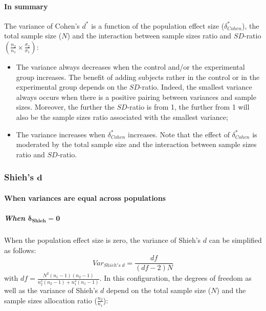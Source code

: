 \documentclass[
  english,
  man,mask,floatsintext]{apa6}
\providecommand{\tightlist}{%
  \setlength{\itemsep}{0pt}\setlength{\parskip}{0pt}}
\let\oldparagraph\paragraph
\renewcommand{\paragraph}[1]{\oldparagraph{#1}\mbox{}}
\let\oldsubparagraph\subparagraph
\renewcommand{\subparagraph}[1]{\oldsubparagraph{#1}\mbox{}}
\begin{document}
\hypertarget{in-summary-3}{%
\paragraph{In summary}\label{in-summary-3}}

The variance of Cohen's \(d^*\) is a function of the population effect size (\(\delta^*_{Cohen}\)), the total sample size (\(N\)) and the interaction between sample sizes ratio and \(SD\)-ratio \(\left(\frac{n_2}{n_1}\times\frac{\sigma_2}{\sigma_1} \right)\):

\begin{itemize}
\tightlist
\item
  The variance always decreases when the control and/or the experimental group increases. The benefit of adding subjects rather in the control or in the experimental group depends on the \(SD\)-ratio. Indeed, the smallest variance always occurs when there is a positive pairing between variances and sample sizes. Moreover, the further the \(SD\)-ratio is from 1, the further from 1 will also be the sample sizes ratio associated with the smallest variance;\\
\item
  The variance increases when \(\delta^*_{Cohen}\) increases. Note that the effect of \(\delta^*_{Cohen}\) is moderated by the total sample size and the interaction between sample sizes ratio and \(SD\)-ratio.
\end{itemize}

\hypertarget{shiehs-bmd}{%
\subsubsection{\texorpdfstring{Shieh's \(\bm{d}\)}{Shieh's \textbackslash bm\{d\}}}\label{shiehs-bmd}}

\hypertarget{when-variances-are-equal-across-populations-5}{%
\paragraph{When variances are equal across populations}\label{when-variances-are-equal-across-populations-5}}

\hypertarget{when-bmdelta_shieh-0}{%
\subparagraph{\texorpdfstring{When \(\bm{\delta_{Shieh} = 0}\)}{When \textbackslash bm\{\textbackslash delta\_\{Shieh\} = 0\}}}\label{when-bmdelta_shieh-0}}

When the population effect size is zero, the variance of Shieh's \(d\) can be simplified as follows:
\[Var_{Shieh's \; d} = \frac{df}{(df-2)N}\]
with \(df = \frac{N^2(n_1-1)(n_2-1)}{n_2^2(n_2-1)+n_1^2(n_1-1)}\). In this configuration, the degrees of freedom as well as the variance of Shieh's \(d\) depend on the total sample size (\(N\)) and the sample sizes allocation ratio (\(\frac{n_2}{n_1}\)):
\end{document}
